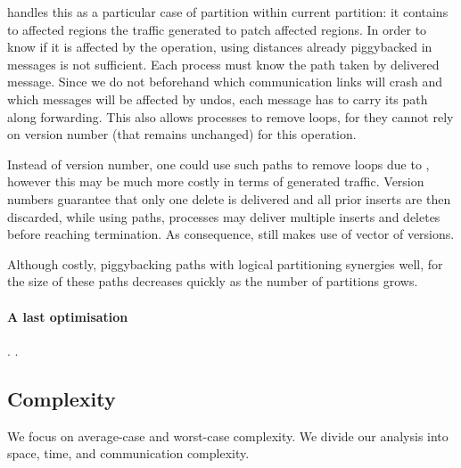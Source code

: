 \noindent \NAME handles this as a particular case of partition within
current partition: it contains to affected regions the traffic
generated to patch affected regions. In order to know if it is
affected by the  operation, using distances already
piggybacked in messages is not sufficient.  Each process must know the
path taken by delivered message. Since we do not beforehand which
communication links will crash and which messages will be affected by
undos, each message has to carry its path along forwarding. This also
allows processes to remove loops, for they cannot rely on version
number (that remains unchanged) for this operation.

\noindent Instead of version number, one could use such paths to remove loops
due to , however this may be much more costly in
terms of generated traffic. Version numbers guarantee that only one
delete is delivered and all prior inserts are then discarded, while
using paths, processes may deliver multiple inserts and deletes before
reaching termination.  As
consequence, \NAME still makes use of vector of versions.

\noindent Although costly, piggybacking paths with logical partitioning synergies
well, for the size of these paths decreases quickly as the number of
partitions grows.

\paragraph{A last optimisation}
 . .

\subsection{Complexity}
\label{subsec:complexity}


We focus on average-case and worst-case complexity. We divide our
analysis into space, time, and communication complexity.

